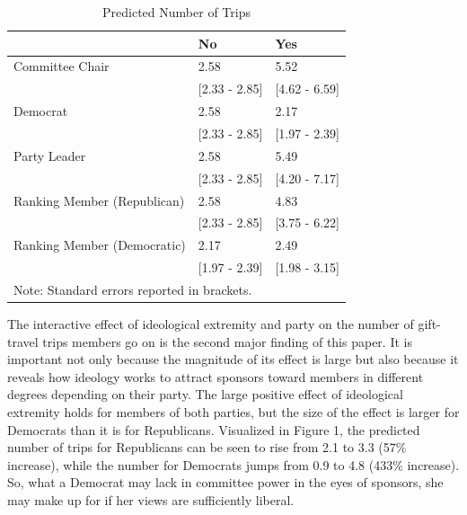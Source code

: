 \documentclass[12pt]{article}                           %
\begin{document}
\begin{table}[h]
\centering
\caption{Predicted Number of Trips}
\label{}
\begin{tabular}{@{}lll@{}}
\toprule
                            & No                 & Yes                 \\ \midrule
Committee Chair             & 2.58              & 5.52              \\
                            & {[}2.33 - 2.85{]} & {[}4.62 - 6.59{]} \\
Democrat                    & 2.58              & 2.17              \\
                            & {[}2.33 - 2.85{]} & {[}1.97 - 2.39{]} \\
Party Leader                & 2.58              & 5.49              \\
                            & {[}2.33 - 2.85{]} & {[}4.20 - 7.17{]} \\
Ranking Member (Republican) & 2.58              & 4.83              \\
                            & {[}2.33 - 2.85{]} & {[}3.75 - 6.22{]} \\
Ranking Member (Democratic) & 2.17              & 2.49              \\
                            & {[}1.97 - 2.39{]} & {[}1.98 - 3.15{]} \\ \bottomrule
\multicolumn{2}{l}{\footnotesize Note: Standard errors reported in brackets.}    \\
\end{tabular}
\end{table}

The interactive effect of ideological extremity and party on the number of gift-travel trips members go on is the second major finding of this paper. It is important not only because the magnitude of its effect is large but also because it reveals how ideology works to attract sponsors toward members in different degrees depending on their party. The large positive effect of ideological extremity holds for members of both parties, but the size of the effect is larger for Democrats than it is for Republicans. Visualized in Figure 1, the predicted number of trips for Republicans can be seen to rise from 2.1 to 3.3 (57\% increase), while the number for Democrats jumps from 0.9 to 4.8 (433\% increase). So, what a Democrat may lack in committee power in the eyes of sponsors, she may make up for if her views are sufficiently liberal.
\end{document}
